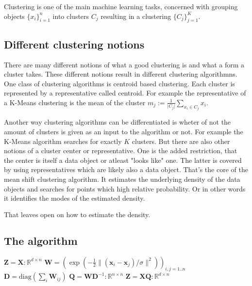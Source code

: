 \documentclass{article}
\begin{document}
Clustering is one of the main machine learning tasks, concerned with grouping objects $\{x_i\}_{i=1}^n$ into clusters $C_j$ resulting in a clustering $\{ C_j \}_{j=1}^K$.

\subsection{Different clustering notions}

There are many different notions of what a good clustering is and what a form a cluster takes. These different notions result in different clustering algorithmns. One class of clustering algorithms is centroid based clustering. Each cluster is represented by a representative called centroid. For example the representative of a K-Means clustering is the mean of the cluster $m_j := \frac{1}{\lvert C_j \rvert} \sum_{x_i \in C_j} x_i$.

Another way clustering algorithms can be differentiated is wheter of not the amount of clusters is given as an input to the algorithm or not. For example the K-Means algorithm searches for exactly $K$ clusters. But there are also other notions of a cluster center or representative. One is the added restriction, that the center is itself a data object or atleast "looks like" one. The latter is covered by using representatives which are likely also a data object. That's the core of the mean shift clustering algorithm. It estimates the underlying density of the data objects and searches for points which high relative probability. Or in other words it identifies the modes of the estimated density.

That leaves open on how to estimate the density.

\subsection{The algorithm}



\begin{algorithmic}
	\State $\bm{Z} = \bm{X} : \mathbb{R}^{d\times n}$
	\Repeat
		\State $\bm{W} = (\exp(-\frac{1}{2} \lVert (\bm{x}_i - \bm{x}_j) / \sigma \rVert^2))_{i,j = 1..n}$
		\State $\bm{D} = \text{diag}(\sum_i \bm{W}_{ij})$
		\State $\bm{Q} = \bm{W} \bm{D}^{-1} : \mathbb{R}^{n\times n}$
		\State $\bm{Z} = \bm{X} \bm{Q} : \mathbb{R}^{d\times n}$
	\State \Return {}
\EndFunction
\end{algorithmic}
\end{document}
